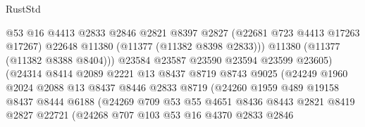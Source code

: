 \begin{lexlean}{RustStd}
\begin{coremodule}
                                  @53
                                  @16
                                  @4413
                                  @2833
                                  @2846
                                  @2821
                                  @8397
                                  @2827
                                  (@22681 @723 @4413 @17263 @17267)
                                  @22648
                                  @11380
                                  (@11377 (@11382 @8398 @2833)))
                                @11380
                                (@11377 (@11382 @8388 @8404)))
                              @23584
                              @23587
                              @23590
                              @23594
                              @23599
                              @23605)
                            (@24314
                              @8414
                              @2089
                              @2221
                              @13
                              @8437
                              @8719
                              @8743
                              @9025
                              (@24249
                                @1960
                                @2024
                                @2088
                                @13
                                @8437
                                @8446
                                @2833
                                @8719
                                (@24260
                                  @1959
                                  @489
                                  @19158
                                  @8437
                                  @8444
                                  @6188
                                  (@24269
                                    @709
                                    @53
                                    @55
                                    @4651
                                    @8436
                                    @8443
                                    @2821
                                    @8419
                                    @2827
                                    @22721
                                    (@24268
                                      @707
                                      @103
                                      @53
                                      @16
                                      @4370
                                      @2833
                                      @2846

\end{coremodule}
\end{lexlean}
